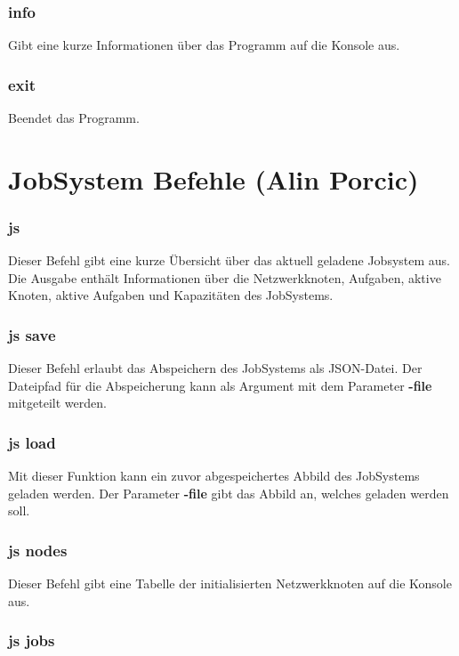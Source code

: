 \documentclass[12pt,a4paper]{report}
\begin{document}
\begin{onehalfspace}
\subsubsection{info}

Gibt eine kurze Informationen über das Programm auf die Konsole aus.

\subsubsection{exit}

Beendet das Programm.

\section{JobSystem Befehle (Alin Porcic)}

\subsubsection{js}

Dieser Befehl gibt eine kurze Übersicht über das aktuell geladene Jobsystem aus. Die Ausgabe enthält Informationen über die Netzwerkknoten, Aufgaben, aktive Knoten, aktive Aufgaben und Kapazitäten des JobSystems.

\subsubsection{js save}

Dieser Befehl erlaubt das Abspeichern des JobSystems als JSON-Datei. Der Dateipfad für die Abspeicherung kann als Argument mit dem Parameter \textbf{-file} mitgeteilt werden.

\subsubsection{js load}

Mit dieser Funktion kann ein zuvor abgespeichertes Abbild des JobSystems geladen werden. Der Parameter \textbf{-file} gibt das Abbild an, welches geladen werden soll.

\subsubsection{js nodes}

Dieser Befehl gibt eine Tabelle der initialisierten Netzwerkknoten auf die Konsole aus.

\subsubsection{js jobs}


\end{onehalfspace}
\end{document}
